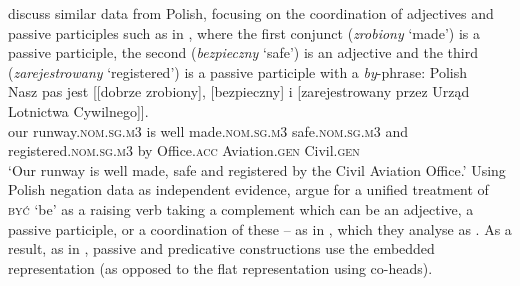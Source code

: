 \documentclass[output=paper]{../langscibook}
\begin{document}
\citet{PatejukPrzepiorkowski2014b} discuss similar data from Polish,
focusing on the coordination of adjectives and passive participles such as in
, where the first conjunct
(\emph{zrobiony} `made') is a passive
participle, the second (\emph{bezpieczny} `safe') is an adjective and
the third (\emph{zarejestrowany} `registered') is a passive
participle with a \emph{by}-phrase:
\ea\label{ex:PatejukPrzepiorkowski2014b:1}
Polish\\\gll
Nasz pas jest [[dobrze zrobiony], [bezpieczny] i [zarejestrowany przez
      Urząd Lotnictwa Cywilnego]]. \\
      our runway.\textsc{nom.sg.m3} is \phtm{[[}well made.\textsc{nom.sg.m3} \phtm{[}safe.\textsc{nom.sg.m3} and \phtm{[}registered.\textsc{nom.sg.m3} by Office.\textsc{acc} Aviation.\textsc{gen} Civil.\textsc{gen}\\
\glt`Our runway is well made, safe and registered by the Civil
    Aviation Office.' \hspace*{\fill} \citep[(1)]{PatejukPrzepiorkowski2014b}
\z
Using Polish negation data as independent evidence,
\citet{PatejukPrzepiorkowski2014b} argue for a unified treatment of
\textsc{być} `be' as a raising verb taking a complement which can be
an adjective, a passive participle, or a coordination of these –
as in , which they analyse as .
As a result, as in
\citet{pete:04}, passive and predicative constructions use the embedded representation
(as opposed to the flat representation using co-heads).
~ \hfill  \citep[(53)]{PatejukPrzepiorkowski2014b}\smallskip
\end{document}
